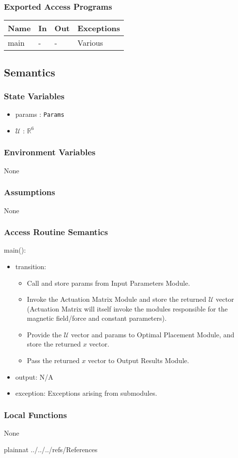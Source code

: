 \documentclass[12pt, titlepage]{article}
\begin{document}
\subsubsection{Exported Access Programs}
\begin{center}
\begin{tabular}{p{3cm} p{4cm} p{4cm} p{3cm}}
\hline
\textbf{Name} & \textbf{In} & \textbf{Out} & \textbf{Exceptions} \\
\hline
main & - & - & Various \\
\hline
\end{tabular}
\end{center}

\subsection{Semantics}

\subsubsection{State Variables}
\begin{itemize}
  \item params : \texttt{Params}
  \item $\mathcal{U}$ : $\mathbb{R}^6$
\end{itemize}

\subsubsection{Environment Variables}
None 

\subsubsection{Assumptions}
None 

\subsubsection{Access Routine Semantics}

\noindent main():
\begin{itemize}
\item transition: 
\begin{itemize}
  \item Call and store params from Input Parameters Module. 
  \item Invoke the Actuation Matrix Module and store the returned $\mathcal{U}$ vector (Actuation Matrix will itself invoke the modules responsible for the magnetic field/force and constant parameters).
  \item Provide the $\mathcal{U}$ vector and params to Optimal Placement Module, and store the returned $x$ vector. 
  \item Pass the returned $x$ vector to Output Results Module. 
\end{itemize}
\item output: N/A
\item exception: Exceptions arising from submodules.
\end{itemize}


\subsubsection{Local Functions}
None

\newpage

 {plainnat}
 {../../../refs/References}
\end{document}

